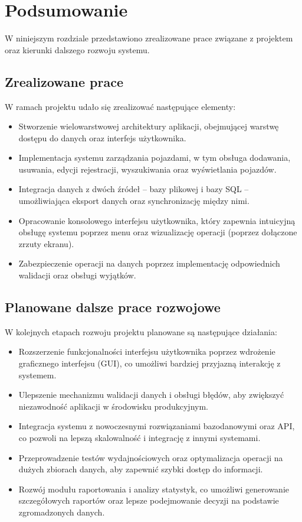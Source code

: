 ﻿%
\chapter{Podsumowanie}

W niniejszym rozdziale przedstawiono zrealizowane prace związane z projektem oraz kierunki dalszego rozwoju systemu.

\section{Zrealizowane prace}
W ramach projektu udało się zrealizować następujące elementy:
\begin{itemize}
    \item Stworzenie wielowarstwowej architektury aplikacji, obejmującej warstwę dostępu do danych oraz interfejs użytkownika.
    \item Implementacja systemu zarządzania pojazdami, w tym obsługa dodawania, usuwania, edycji rejestracji, wyszukiwania oraz wyświetlania pojazdów.
    \item Integracja danych z dwóch źródeł – bazy plikowej i bazy SQL – umożliwiająca eksport danych oraz synchronizację między nimi.
    \item Opracowanie konsolowego interfejsu użytkownika, który zapewnia intuicyjną obsługę systemu poprzez menu oraz wizualizację operacji (poprzez dołączone zrzuty ekranu).
    \item Zabezpieczenie operacji na danych poprzez implementację odpowiednich walidacji oraz obsługi wyjątków.
\end{itemize}

\section{Planowane dalsze prace rozwojowe}
W kolejnych etapach rozwoju projektu planowane są następujące działania:
\begin{itemize}
    \item Rozszerzenie funkcjonalności interfejsu użytkownika poprzez wdrożenie graficznego interfejsu (GUI), co umożliwi bardziej przyjazną interakcję z systemem.
    \item Ulepszenie mechanizmu walidacji danych i obsługi błędów, aby zwiększyć niezawodność aplikacji w środowisku produkcyjnym.
    \item Integracja systemu z nowoczesnymi rozwiązaniami bazodanowymi oraz API, co pozwoli na lepszą skalowalność i integrację z innymi systemami.
    \item Przeprowadzenie testów wydajnościowych oraz optymalizacja operacji na dużych zbiorach danych, aby zapewnić szybki dostęp do informacji.
    \item Rozwój modułu raportowania i analizy statystyk, co umożliwi generowanie szczegółowych raportów oraz lepsze podejmowanie decyzji na podstawie zgromadzonych danych.
\end{itemize}



